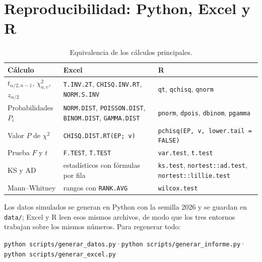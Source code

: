 \documentclass[11pt]{article}
\begin{document}
\section{Reproducibilidad: Python, Excel y R}
\begin{table}[H]\centering\small\caption{Equivalencia de los cálculos principales.}
\begin{tabularx}{\linewidth}{lXX}\toprule
\textbf{Cálculo} & \textbf{Excel} & \textbf{R}\\\midrule
$t_{\alpha/2,n-1}$, $\chi^2_{a,v}$, $z_{\alpha/2}$ & \texttt{T.INV.2T}, \texttt{CHISQ.INV.RT}, \texttt{NORM.S.INV} &
\texttt{qt}, \texttt{qchisq}, \texttt{qnorm}\\
Probabilidades $P_i$ & \texttt{NORM.DIST}, \texttt{POISSON.DIST}, \texttt{BINOM.DIST}, \texttt{GAMMA.DIST} &
\texttt{pnorm}, \texttt{dpois}, \texttt{dbinom}, \texttt{pgamma}\\
Valor $P$ de $\chi^2$ & \texttt{CHISQ.DIST.RT(EP; v)} & \texttt{pchisq(EP, v, lower.tail = FALSE)}\\
Prueba $F$ y $t$ & \texttt{F.TEST}, \texttt{T.TEST} & \texttt{var.test}, \texttt{t.test}\\
KS y AD & estadísticos con fórmulas por fila & \texttt{ks.test}, \texttt{nortest::ad.test}, \texttt{nortest::lillie.test}\\
Mann–Whitney & rangos con \texttt{RANK.AVG} & \texttt{wilcox.test}\\\bottomrule
\end{tabularx}\end{table}
Los datos simulados se generan en Python con la semilla 2026 y se guardan en \texttt{data/}; Excel y R leen esos
mismos archivos, de modo que los tres entornos trabajan sobre los mismos números. Para regenerar todo:
\begin{center}\texttt{python scripts/generar\_datos.py}\quad·\quad\texttt{python scripts/generar\_informe.py}\quad·\quad
\texttt{python scripts/generar\_excel.py}\end{center}
\end{document}
